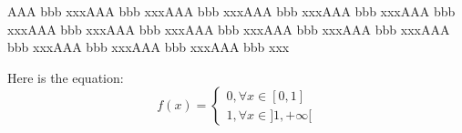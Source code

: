 \documentclass[10pt,a4paper]{article}
\author{Ludovic}
\begin{document}
AAA bbb xxxAAA bbb xxxAAA bbb xxxAAA bbb xxxAAA bbb xxxAAA bbb xxxAAA bbb xxxAAA bbb xxxAAA bbb xxxAAA bbb xxxAAA bbb xxxAAA bbb xxxAAA bbb xxxAAA bbb xxxAAA bbb xxx


Here is the equation: 
$$
f(x) = \left\lbrace
\begin{split}
0, \forall x \in [0, 1] \\
1, \forall x \in ]1, +\infty[
\end{split}\right.
$$
\end{document}
